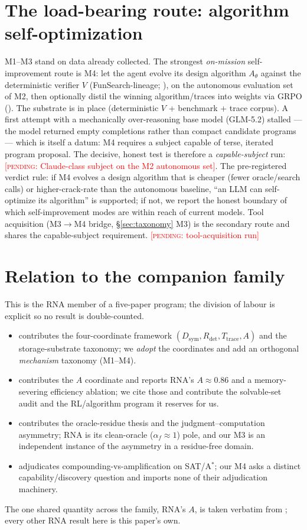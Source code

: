 \documentclass[11pt]{article}
\newcommand{\Dsym}{D_{\mathrm{sym}}}
\newcommand{\Rdet}{R_{\mathrm{det}}}
\newcommand{\Ttrace}{T_{\mathrm{trace}}}
\newcommand{\pending}[1]{\textcolor{red}{[\textsc{pending}: #1]}}
\begin{document}
\section{The load-bearing route: algorithm self-optimization}\label{sec:engine}
M1--M3 stand on data already collected. The strongest \emph{on-mission} self-improvement route is M4:
let the agent evolve its design algorithm $A_\theta$ against the deterministic verifier $V$
(FunSearch-lineage; \citealp{romera2024funsearch}), on the autonomous evaluation set of M2, then
optionally distil the winning algorithm/traces into weights via GRPO
(\citealp{shao2024deepseekmath}). The substrate is in place (deterministic $V$ + benchmark + trace
corpus). A first attempt with a mechanically over-reasoning base model (GLM-5.2) stalled --- the model
returned empty completions rather than compact candidate programs --- which is itself a datum: M4
requires a subject capable of terse, iterated program proposal. The decisive, honest test is
therefore a \emph{capable-subject} run: \pending{Claude-class subject on the M2 autonomous set}.
The pre-registered verdict rule: if M4 evolves a design algorithm that is cheaper (fewer
oracle/search calls) or higher-crack-rate than the autonomous baseline, ``an LLM can self-optimize
its algorithm'' is supported; if not, we report the honest boundary of which self-improvement modes
are within reach of current models. Tool acquisition (M3$\to$M4 bridge, \S\ref{sec:taxonomy} M3) is
the secondary route and shares the capable-subject requirement. \pending{tool-acquisition run}

\section{Relation to the companion family}\label{sec:family}
This is the RNA member of a five-paper program; the division of labour is explicit so no result is
double-counted.
\begin{itemize}
\item \citet{determinismmanifold} contributes the four-coordinate framework $(\Dsym,\Rdet,\Ttrace,A)$
  and the storage-substrate taxonomy; we \emph{adopt} the coordinates and add an orthogonal
  \emph{mechanism} taxonomy (M1--M4).
\item \citet{actuation} contributes the $A$ coordinate and reports RNA's $A\approx0.86$ and a
  memory-severing efficiency ablation; we cite those and contribute the solvable-set audit and the
  RL/algorithm program it reserves for us.
\item \citet{oracleresidue} contributes the oracle-residue thesis and the judgment--computation
  asymmetry; RNA is its clean-oracle ($\alpha_f\!\approx\!1$) pole, and our M3 is an independent
  instance of the asymmetry in a residue-free domain.
\item \citet{compoundingprofile} adjudicates compounding-vs-amplification on SAT/A$^\ast$; our M4 asks
  a distinct capability/discovery question and imports none of their adjudication machinery.
\end{itemize}
The one shared quantity across the family, RNA's $A$, is taken verbatim from \citet{actuation}; every
other RNA result here is this paper's own.
\end{document}
